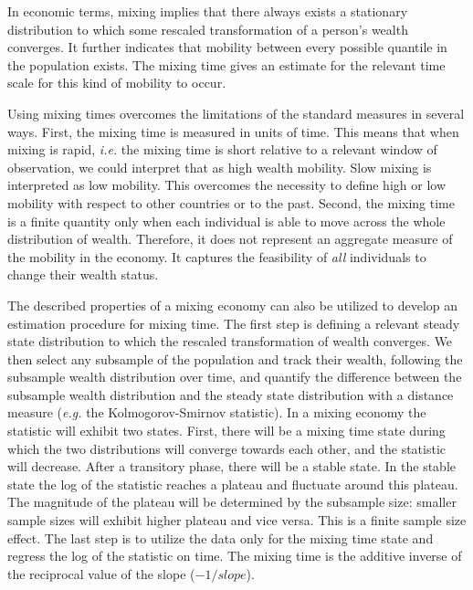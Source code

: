 \documentclass[11pt]{article}
\newcommand{\ie}{{\it i.e.}\xspace}
\newcommand{\eg}{{\it e.g.}\xspace}
\numberwithin{equation}{section}
\begin{document}
In economic terms, mixing implies that there always exists a stationary distribution to which some rescaled transformation of a person's wealth converges. It further indicates that mobility between every possible quantile in the population exists. The mixing time gives an estimate for the relevant time scale for this kind of mobility to occur.

Using mixing times overcomes the limitations of the standard measures in several ways. First, the mixing time is measured in units of time. This means that when mixing is rapid, \ie the mixing time is short relative to a relevant window of observation, we could interpret that as high wealth mobility. Slow mixing is interpreted as low mobility. This overcomes the necessity to define high or low mobility with respect to other countries or to the past. Second, the mixing time is a finite quantity only when each individual is able to move across the whole distribution of wealth. Therefore, it does not represent an aggregate measure of the mobility in the economy. It captures the feasibility of \textit{all} individuals to change their wealth status.

The described properties of a mixing economy can also be utilized to develop an estimation procedure for mixing time. The first step is defining a relevant steady state distribution to which the rescaled transformation of wealth converges. We then select any subsample of the population and track their wealth, following the subsample wealth distribution over time, and quantify the difference between the subsample wealth distribution and the steady state distribution with a distance measure (\eg the Kolmogorov-Smirnov statistic). In a mixing economy the statistic will exhibit two states. First, there will be a mixing time state during which the two distributions will converge towards each other, and the statistic will decrease. After a transitory phase, there will be a stable state. In the stable state the log of the statistic reaches a plateau and fluctuate around this plateau. The magnitude of the plateau will be determined by the subsample size: smaller sample sizes will exhibit higher plateau and vice versa. This is a finite sample size effect. The last step is to utilize the data only for the mixing time state and regress the log of the statistic on time. The mixing time is the additive inverse of the reciprocal value of the slope ($-1/slope$).
\end{document}
